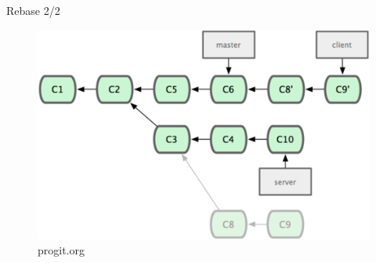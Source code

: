 \documentclass{beamer}
\begin{document}
\begin{frame}{Rebase 2/2}
  \begin{figure}
    \begin{center}
    \includegraphics[scale=1]{img/Rebase.png}
    \end{center}
    \caption{progit.org}
  \end{figure}
\end{frame}
\end{document}
